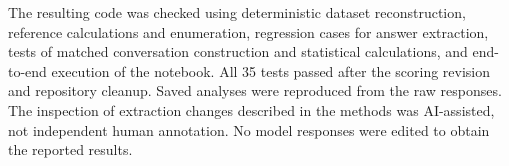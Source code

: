 \documentclass[11pt]{article}
\begin{document}
The resulting code was checked using deterministic dataset reconstruction, reference calculations and enumeration, regression cases for answer extraction, tests of matched conversation construction and statistical calculations, and end-to-end execution of the notebook. All 35 tests passed after the scoring revision and repository cleanup. Saved analyses were reproduced from the raw responses. The inspection of extraction changes described in the methods was AI-assisted, not independent human annotation. No model responses were edited to obtain the reported results.
\end{document}
